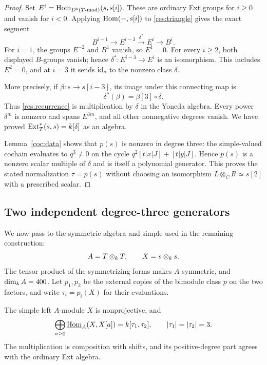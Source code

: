 \begin{proof}
Set $E^i=\operatorname{Hom}_{D^b(T\text{-mod})}(s,s[i])$. These are ordinary Ext
groups for $i\geq0$ and vanish for $i<0$. Applying
$\operatorname{Hom}(-,s[i])$ to \eqref{res:triangle} gives the exact segment
\begin{equation}\label{res:recurrence}
 B^{i-1}\longrightarrow E^{i-3}
 \xrightarrow{\,\delta^*\,}E^i\longrightarrow B^i.
\end{equation}
For $i=1$, the groups $E^{-2}$ and $B^1$ vanish, so $E^1=0$.
For every $i\geq2$, both displayed $B$-groups vanish; hence
$\delta^*:E^{i-3}\to E^i$ is an isomorphism. This includes $E^2=0$,
and at $i=3$ it sends $\operatorname{id}_s$ to the nonzero class $\delta$.

More precisely, if $\beta:s\to s[i-3]$, its image under this connecting
map is
\[
 \delta^*(\beta)=\beta[3]\circ\delta.
\]
Thus \eqref{res:recurrence} is multiplication by $\delta$ in the Yoneda
algebra. Every power $\delta^m$ is nonzero and spans $E^{3m}$, and all
other nonnegative degrees vanish. We have proved
$\operatorname{Ext}_T^*(s,s)=k[\delta]$ as an algebra.

Lemma~\ref{coc:data} shows that $p(s)$ is nonzero in degree three: the
simple-valued cochain evaluates to $q^3\ne0$ on the cycle
$q^2[t|x|J]+[t|y|J]$. Hence $p(s)$ is a nonzero scalar multiple of
$\delta$ and is itself a polynomial generator. This proves the stated
normalization $\tau=p(s)$ without choosing an isomorphism
$L\otimes_C R\simeq s[2]$ with a prescribed scalar.
\end{proof}

\subsection{Two independent degree-three generators}

We now pass to the symmetric algebra and simple used in the remaining
construction:
\[
 A=T\otimes_{k}T,\qquad X=s\otimes_{k}s.
\]
The tensor product of the symmetrizing forms makes $A$ symmetric, and
$\dim_{k}A=400$. Let $p_1,p_2$ be the external copies of the
bimodule class $p$ on the two factors, and write
$\tau_i=p_i(X)$ for their evaluations.

\begin{lemma}\label{res:tensor}
The simple left $A$-module $X$ is nonprojective, and
\[
 \bigoplus_{a\geq0}\underline{\operatorname{Hom}}_{A}(X,X[a])
 =k[\tau_1,\tau_2],\qquad |\tau_1|=|\tau_2|=3.
\]
The multiplication is composition with shifts, and its positive-degree
part agrees with the ordinary Ext algebra.
\end{lemma}

